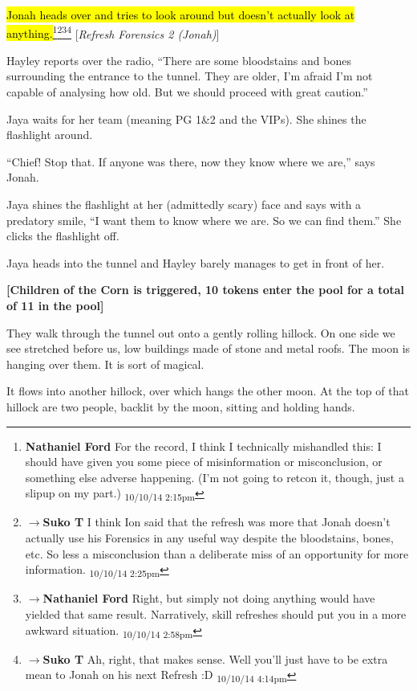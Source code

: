 \hl{Jonah heads over and tries to look around but doesn't actually look at anything.}\footnote{\textbf{Nathaniel Ford }For the record, I think I technically mishandled this: I should have given you some piece of misinformation or misconclusion, or something else adverse happening. (I'm not going to retcon it, though, just a slipup on my part.) \textsubscript{10/10/14 2:15pm}}\footnote{$\rightarrow$\textbf{Suko T }I think Ion said that the refresh was more that Jonah doesn't actually use his Forensics in any useful way despite the bloodstains, bones, etc.  So less a misconclusion than a deliberate miss of an opportunity for more information. \textsubscript{10/10/14 2:25pm}}\footnote{$\rightarrow$\textbf{Nathaniel Ford }Right, but simply not doing anything would have yielded that same result. Narratively, skill refreshes should put you in a more awkward situation. \textsubscript{10/10/14 2:58pm}}\footnote{$\rightarrow$\textbf{Suko T }Ah, right, that makes sense. Well you'll just have to be extra mean to Jonah on his next Refresh :D \textsubscript{10/10/14 4:14pm}} {[}\textit{Refresh Forensics 2 (Jonah)}{]}

Hayley reports over the radio, ``There are some bloodstains and bones surrounding the entrance to the tunnel.  They are older, I'm afraid I'm not capable of analysing how old.  But we should proceed with great caution.''

Jaya waits for her team (meaning PG 1\&2 and the VIPs).  She shines the flashlight around.

``Chief!  Stop that.  If anyone was there, now they know where we are,'' says Jonah.

Jaya shines the flashlight at her (admittedly scary) face and says with a predatory smile, ``I want them to know where we are.  So we can find them.'' She clicks the flashlight off.



Jaya heads into the tunnel and Hayley barely manages to get in front of her.  



\textbf{{[}Children of the Corn is triggered, 10 tokens enter the pool for a total of 11 in the pool{]}}



They walk through the tunnel out onto a gently rolling hillock.  On one side we see stretched before us, low buildings made of stone and metal roofs. The moon is hanging over them.  It is sort of magical.  



It flows into another hillock, over which hangs the other moon.  At the top of that hillock are two people, backlit by the moon, sitting and holding hands.  



